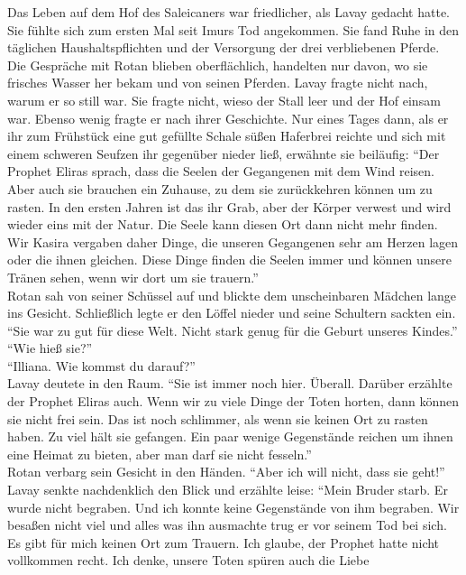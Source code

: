 Das Leben auf dem Hof des Saleicaners war friedlicher, als Lavay gedacht hatte. Sie fühlte sich zum 
ersten Mal seit Imurs Tod angekommen. Sie fand Ruhe in den täglichen Haushaltspflichten und der 
Versorgung der drei verbliebenen Pferde. Die Gespräche mit Rotan blieben oberflächlich, handelten 
nur davon, wo sie frisches Wasser her bekam und von seinen Pferden. Lavay fragte nicht nach, warum 
er so still war. Sie fragte nicht, wieso der Stall leer und der Hof einsam war. Ebenso wenig fragte 
er nach ihrer Geschichte. Nur eines Tages dann, als er ihr zum Frühstück eine gut gefüllte Schale 
süßen Haferbrei reichte und sich mit einem schweren Seufzen ihr gegenüber nieder ließ, erwähnte sie 
beiläufig: ``Der Prophet Eliras sprach, dass die Seelen der Gegangenen mit dem Wind reisen. Aber 
auch sie brauchen ein Zuhause, zu dem sie zurückkehren können um zu rasten. In den ersten Jahren 
ist das ihr Grab, aber der Körper verwest und wird wieder eins mit der Natur. Die Seele kann diesen 
Ort dann nicht mehr finden. Wir Kasira vergaben daher Dinge, die unseren Gegangenen sehr am Herzen 
lagen oder die ihnen gleichen. Diese Dinge finden die Seelen immer und können unsere Tränen sehen, 
wenn wir dort um sie trauern.''\\
Rotan sah von seiner Schüssel auf und blickte dem unscheinbaren Mädchen lange ins Gesicht. 
Schließlich legte er den Löffel nieder und seine Schultern sackten ein. ``Sie war zu gut für diese 
Welt. Nicht stark genug für die Geburt unseres Kindes.''\\
``Wie hieß sie?''\\
``Illiana. Wie kommst du darauf?''\\
Lavay deutete in den Raum. ``Sie ist immer noch hier. Überall. Darüber erzählte der Prophet Eliras 
auch. Wenn wir zu viele Dinge der Toten horten, dann können sie nicht frei sein. Das ist noch 
schlimmer, als wenn sie keinen Ort zu rasten haben. Zu viel hält sie gefangen. Ein paar wenige 
Gegenstände reichen um ihnen eine Heimat zu bieten, aber man darf sie nicht fesseln.''\\
Rotan verbarg sein Gesicht in den Händen. ``Aber ich will nicht, dass sie geht!''\\
Lavay senkte nachdenklich den Blick und erzählte leise: ``Mein Bruder starb. Er wurde nicht 
begraben. Und ich konnte keine Gegenstände von ihm begraben. Wir besaßen nicht viel und alles was 
ihn ausmachte trug er vor seinem Tod bei sich. Es gibt für mich keinen Ort zum Trauern. Ich 
glaube, der Prophet hatte nicht vollkommen recht. Ich denke, unsere Toten spüren auch die Liebe 
